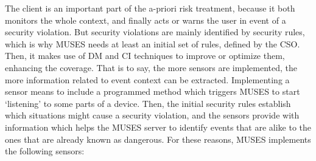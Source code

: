 The client is an important part of the a-priori risk treatment, because it both monitors the whole context, and finally acts or warns the user in event of a security violation. 
But security violations are mainly identified by security rules, which is why MUSES needs at least an initial set of rules, defined by the CSO. Then, it makes use of DM and CI techniques to improve or optimize them, enhancing the coverage. 
That is to say, the more sensors are implemented, the more information related to event context can be extracted. Implementing a sensor means to include a programmed method which triggers MUSES to start `listening' to some parts of a device. Then, the initial security rules establish which situations might cause a security violation, and the sensors provide with information which helps the MUSES server to identify events that are alike to the ones that are already known as dangerous.
For these reasons, MUSES implements the following sensors:

